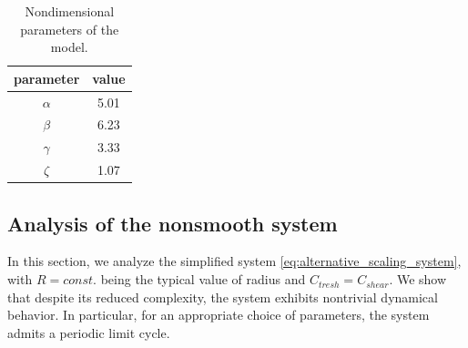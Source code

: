 \documentclass[12pt,a4paper]{article}
\begin{document}
\begin{table}
\centering
\begin{tabular}{cc}
  \toprule
  parameter & value \\
  \midrule
  $\alpha$ & 5.01 \\
  $\beta$ & 6.23 \\
  $\gamma$ & 3.33 \\
  $\zeta$ & 1.07 \\
  \bottomrule
\end{tabular}
\caption{Nondimensional parameters of the model.}

\label{tab:NondimensionalParameters}
\end{table}

\subsection{Analysis of the nonsmooth system}
In this section, we analyze the simplified system \eqref{eq:alternative_scaling_system}, with $R=const.$ being the typical value of radius and $C_{tresh}=C_{shear}$. We show that despite its reduced complexity, the system exhibits nontrivial dynamical behavior. In particular, for an appropriate choice of parameters, the system admits a periodic limit cycle.
\end{document}
